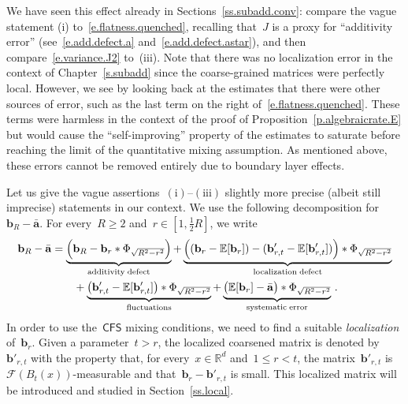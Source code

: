 \documentclass[11pt,twoside]{article} %
\numberwithin{equation}{section}
\theoremstyle{definition}
\newcommand*{\R}{\ensuremath{\mathbb{R}}}
\renewcommand{\b}{\ensuremath{\mathbf{b}}}
\renewcommand{\a}{\mathbf{a}}
\newcommand{\ahom}{\bar{\a}}
\newcommand{\F}{\mathcal{F}}
\newcommand{\E}{\mathbb{E}}
\newcommand{\CFS}{\mathsf{CFS}}
\begin{document}
\smallskip

We have seen this effect already in Sections~\ref{ss.subadd.conv}: compare the vague statement (i) to~\eqref{e.flatness.quenched}, recalling that~$J$ is a proxy for ``additivity error'' (see~\eqref{e.add.defect.a} and~\eqref{e.add.defect.astar}), and then compare~\eqref{e.variance.J2} to~(iii). Note that there was no localization error in the context of Chapter~\ref{s.subadd} since the coarse-grained matrices were perfectly local. 
However, we see by looking back at the estimates that there were other sources of error, such as the last term on the right of~\eqref{e.flatness.quenched}. These terms were harmless in the context of the proof of Proposition~\ref{p.algebraicrate.E} but would cause the ``self-improving'' property of the estimates to saturate before reaching the limit of the quantitative mixing assumption. As mentioned above, these errors cannot be removed entirely due to boundary layer effects.

\smallskip

Let us give the vague assertions~$\mathrm{(i)}$--$\mathrm{(iii)}$ slightly more precise (albeit still imprecise) statements in our context. 
We use the following decomposition for~$\b_R - \ahom$. For every~$R\geq 2$ and~$r \in [1, \frac12 R]$, we write   
\begin{align} 
\notag
\b_R - \ahom
&
=
\underbrace{
\Bigl( \b_R - \b_r \ast \Phi_{\sqrt{R^2-r^2}} \Bigr) 
}_{\mathrm{additivity \; defect}}
+
\underbrace{
\Bigl( (\b_r - \E [ \b_r ]) - (\b'_{r,t} - \E [ \b'_{r,t} ] )  \Bigr) \ast \Phi_{\sqrt{R^2-r^2}} 
}_{\mathrm{localization \; defect}}
\notag \\ & \qquad
+ \underbrace{
\bigl( \b'_{r,t} - \E [ \b'_{r,t} ] \bigr) \ast \Phi_{\sqrt{R^2-r^2}}
}_{\mathrm{fluctuations}}
+
\underbrace{
\bigl( \E [ \b_r ]- \ahom \bigr) \ast \Phi_{\sqrt{R^2-r^2}}
}_{\mathrm{systematic \;  error}}
\,.
\label{e.ahomr.splitting}
\end{align} 
In order to use the~$\CFS$ mixing conditions, we need to find a suitable \emph{localization} of~$\b_r$. Given a parameter~$t > r$, the localized coarsened matrix is denoted by~$\b'_{r,t}$ with the property that, for every~$x\in \R^d$ and~$1\leq r< t$, the matrix~$\b'_{r,t}$ is~$\F(B_{t}(x))$-measurable and that~$\b_r - \b'_{r,t}$ is small. This localized matrix will be introduced and studied in Section~\ref{ss.local}.

\smallskip
\end{document}
